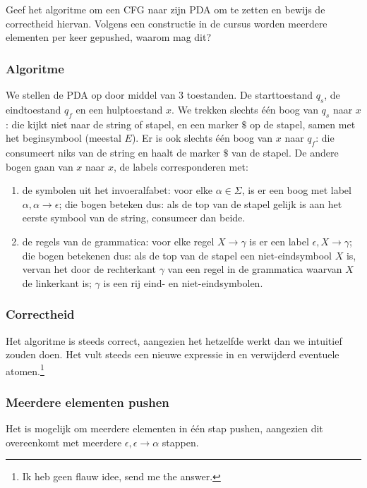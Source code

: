 \begin{quest}[Vraag 9]
Geef het algoritme om een CFG naar zijn PDA om te zetten en bewijs de correctheid hiervan.
Volgens een constructie in de cursus worden meerdere elementen per keer gepushed, waarom mag dit?
\end{quest}

\subsubsection*{Algoritme}

We stellen de PDA op door middel van 3 toestanden. De starttoestand $q_s$, de eindtoestand $q_f$ en een hulptoestand $x$. We trekken slechts \'e\'en boog van $q_s$ naar $x$: die kijkt niet naar de string of stapel, en een marker $\$$ op de stapel, samen met het beginsymbool (meestal $E$). Er is ook slechts \'e\'en boog van $x$ naar $q_f$: die consumeert niks van de string en haalt de marker $\$$ van de stapel. De andere bogen gaan van $x$ naar $x$, de labels corresponderen met:
\begin{enumerate}
	\item de symbolen uit het invoeralfabet: voor elke $\alpha \in \Sigma$, is er een boog met label $\alpha, \alpha \rightarrow \epsilon$; die bogen beteken dus: als de top van de stapel gelijk is aan het eerste symbool van de string, consumeer dan beide.
	\item de regels van de grammatica: voor elke regel $X \rightarrow \gamma$ is er een label $\epsilon,X \rightarrow \gamma$; die bogen betekenen dus: als de top van de stapel een niet-eindsymbool $X$ is, vervan het door de rechterkant $\gamma$ van een regel in de grammatica waarvan $X$ de linkerkant is; $\gamma$ is een rij eind- en niet-eindsymbolen.
\end{enumerate}

\subsubsection*{Correctheid}

Het algoritme is steeds correct, aangezien het hetzelfde werkt dan we intuitief zouden doen. Het vult steeds een nieuwe expressie in en verwijderd eventuele atomen.\footnote{Ik heb geen flauw idee, send me the answer.}

\subsubsection*{Meerdere elementen pushen}

Het is mogelijk om meerdere elementen in \'e\'en stap pushen, aangezien dit overeenkomt met meerdere $\epsilon, \epsilon \rightarrow \alpha$ stappen.